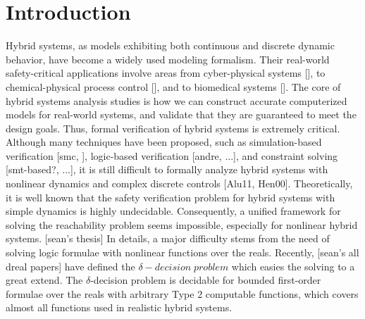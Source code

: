 \documentclass[runningheads,a4paper]{llncs}
\begin{document}
\section{Introduction}
\begin{comment}
- Start with the motivations (application areas needing both nonlinear arithmetic and probabilistic system parameters. (Hybrid systems))\\
- Introduce dReal and dReach as the SMT solver and the checker for Hybrid models. (focus on the strength of dReal - sound and relatively complete for nonlinear)\\
- Introduce the statistical model checking, especially different statistical analyzing methods to estimate the probability of a model satisfying a property.
\end{comment}

Hybrid systems, as models exhibiting both continuous and discrete dynamic behavior, have become a widely used modeling formalism. Their real-world safety-critical applications involve areas from cyber-physical systems [], to chemical-physical process control [], and to biomedical systems []. The core of hybrid systems analysis studies is how we can construct accurate computerized models for real-world systems, and validate that they are guaranteed to meet the design goals. Thus, formal verification of hybrid systems is extremely critical. Although many techniques have been proposed, such as simulation-based verification [smc, ], logic-based verification [andre, ...], and constraint solving [smt-based?, ...], it is still difficult to formally analyze hybrid systems with nonlinear dynamics and complex discrete controls [Alu11, Hen00]. Theoretically, it is well known that the safety verification problem for hybrid systems with simple dynamics is highly undecidable. Consequently, a unified framework for solving the reachability problem seems impossible, especially for nonlinear hybrid systems. [sean's thesis] In details, a major difficulty stems from the need of solving logic formulae with nonlinear functions over the reals. Recently, [sean's all dreal papers] have defined the $\delta-decision \;  problem$ which easies the solving to a great extend. The $\delta$-decision problem is decidable for bounded first-order formulae over the reals with arbitrary Type 2 computable functions, which covers almost all functions used in realistic hybrid systems. 
\end{document}
